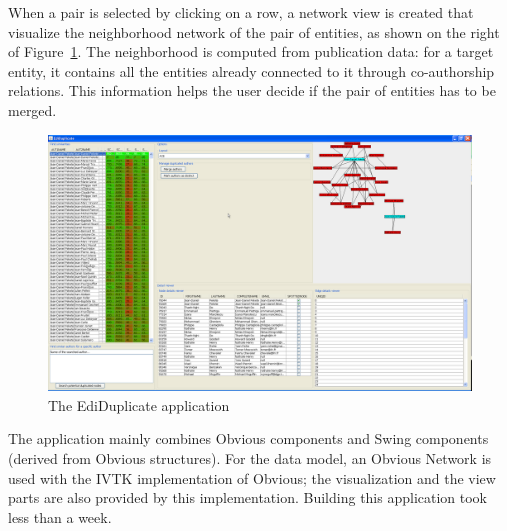 When a pair is selected by clicking on a row, a network view is created
that visualize the neighborhood network of the pair of entities, as
shown on the right of Figure~\ref{fig:ediduplicate}.  The
neighborhood is computed from publication data: for a target entity,
it contains all the entities already connected to it through
co-authorship relations.  This information helps the user decide if
the pair of entities has to be merged.

\begin{figure}[!h]
\includegraphics[width=\columnwidth]{figures/ediduplicate}
\caption{The EdiDuplicate application}
\label{fig:ediduplicate}
\end{figure}

The application mainly combines Obvious components and Swing
components (derived from Obvious structures). For the data model, an
Obvious Network is used with the IVTK implementation of Obvious; the
visualization and the view parts are also provided by this
implementation.  Building this application took less than a week.

